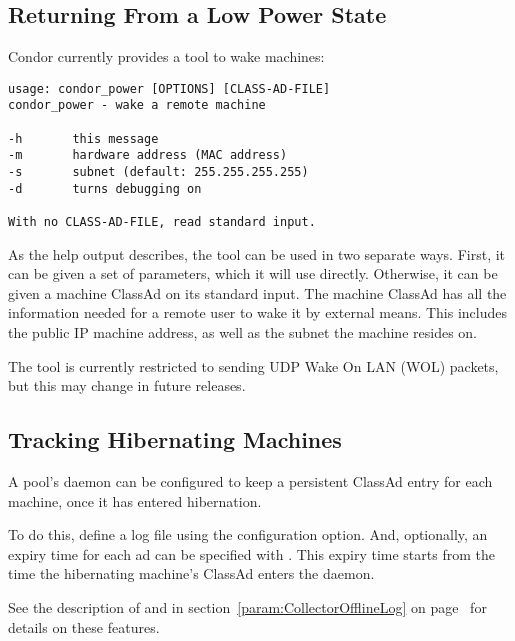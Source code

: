 \subsection{Returning From a Low Power State}

Condor currently provides a tool  to wake machines:

\begin{verbatim}
usage: condor_power [OPTIONS] [CLASS-AD-FILE]
condor_power - wake a remote machine

-h       this message
-m       hardware address (MAC address)
-s       subnet (default: 255.255.255.255)
-d       turns debugging on

With no CLASS-AD-FILE, read standard input.
\end{verbatim}

As the help output describes, the tool can be used in two separate ways. 
First, it can be given a set of parameters, which it will use directly. 
Otherwise, it can be given a machine ClassAd on its standard input.
The machine ClassAd has all the information needed for a remote user
to wake it by external means. This includes the public IP machine address,
as well as the subnet the machine resides on.

The tool is currently restricted to sending UDP Wake On LAN (WOL) packets, 
but this may change in future releases.

\subsection{Tracking Hibernating Machines}

A pool's  daemon can be configured to keep a 
persistent ClassAd entry for each machine, once it has entered hibernation.

To do this, define a log file using the 
configuration option.  And, optionally, an expiry time for each ad can
be specified with .  This expiry
time starts from the time the hibernating machine's ClassAd enters
the  daemon.

See the description of  and
 in
section~\ref{param:CollectorOfflineLog} on
page~\pageref{param:CollectorOfflineLog} for details on
these features.


